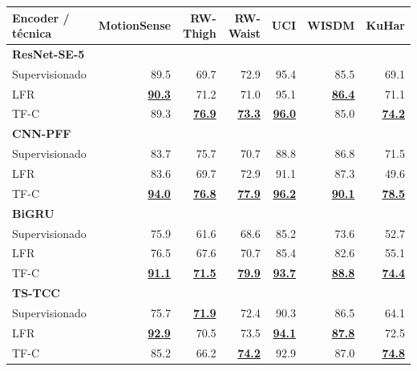 \begin{tabular}{lrrrrrr}
\toprule
\textbf{Encoder / técnica} & \textbf{MotionSense} & \textbf{RW-Thigh} & \textbf{RW-Waist} & \textbf{UCI} & \textbf{WISDM} & \textbf{KuHar} \\
\midrule
\textbf{ResNet-SE-5} &  &  &  &  &  &  \\
\quad Supervisionado & 89.5 & 69.7 & 72.9 & 95.4 & 85.5 & 69.1 \\
\quad LFR & \underline{\textbf{90.3}} & 71.2 & 71.0 & 95.1 & \underline{\textbf{86.4}} & 71.1 \\
\quad TF-C & 89.3 & \underline{\textbf{76.9}} & \underline{\textbf{73.3}} & \underline{\textbf{96.0}} & 85.0 & \underline{\textbf{74.2}} \\
\textbf{CNN-PFF} &  &  &  &  &  &  \\
\quad Supervisionado & 83.7 & 75.7 & 70.7 & 88.8 & 86.8 & 71.5 \\
\quad LFR & 83.6 & 69.7 & 72.9 & 91.1 & 87.3 & 49.6 \\
\quad TF-C & \underline{\textbf{94.0}} & \underline{\textbf{76.8}} & \underline{\textbf{77.9}} & \underline{\textbf{96.2}} & \underline{\textbf{90.1}} & \underline{\textbf{78.5}} \\
\textbf{BiGRU} &  &  &  &  &  &  \\
\quad Supervisionado & 75.9 & 61.6 & 68.6 & 85.2 & 73.6 & 52.7 \\
\quad LFR & 76.5 & 67.6 & 70.7 & 85.4 & 82.6 & 55.1 \\
\quad TF-C & \underline{\textbf{91.1}} & \underline{\textbf{71.5}} & \underline{\textbf{79.9}} & \underline{\textbf{93.7}} & \underline{\textbf{88.8}} & \underline{\textbf{74.4}} \\
\textbf{TS-TCC} &  &  &  &  &  &  \\
\quad Supervisionado & 75.7 & \underline{\textbf{71.9}} & 72.4 & 90.3 & 86.5 & 64.1 \\
\quad LFR & \underline{\textbf{92.9}} & 70.5 & 73.5 & \underline{\textbf{94.1}} & \underline{\textbf{87.8}} & 72.5 \\
\quad TF-C & 85.2 & 66.2 & \underline{\textbf{74.2}} & 92.9 & 87.0 & \underline{\textbf{74.8}} \\
\bottomrule
\end{tabular}
